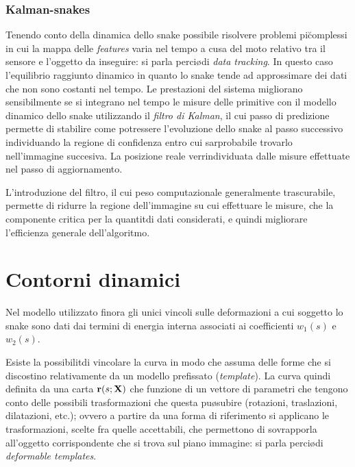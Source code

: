 \subsubsection{Kalman-snakes}

Tenendo conto della dinamica dello snake \e possibile risolvere problemi pi\u complessi
in cui la mappa delle {\it features} varia nel tempo a cusa del moto relativo tra il sensore
e l'oggetto da inseguire: si parla perci\o di {\it data tracking}.
In questo caso l'equilibrio raggiunto \e dinamico in quanto lo snake tende ad approssimare
dei dati che non sono costanti nel tempo.
Le prestazioni del sistema migliorano sensibilmente se si integrano nel tempo le misure
delle primitive con il modello dinamico dello snake utilizzando il {\it filtro di Kalman},
il cui passo di predizione permette di stabilire come potr\a essere l'evoluzione dello
snake al passo successivo individuando la regione di confidenza entro cui sar\a probabile
trovarlo nell'immagine succesiva.
La posizione reale verr\a individuata dalle misure effettuate nel passo di aggiornamento.

L'introduzione del filtro, il cui peso computazionale \e generalmente trascurabile,
permette di ridurre la regione dell'immagine su cui effettuare le misure, che \e la
componente critica per la quantit\a di dati considerati, e quindi migliorare l'efficienza
generale dell'algoritmo.

\section{Contorni dinamici}

Nel modello utilizzato finora gli unici vincoli sulle deformazioni a cui \e soggetto lo snake
sono dati dai termini di energia interna associati ai coefficienti $w_1(s)$ e $w_2(s)$.

Esiste la possibilit\a di vincolare la curva in modo che assuma delle forme che si discostino
relativamente da un modello prefissato ({\it template}).
La curva \e quindi definita da una carta ${\bf r}(s;{\bf X})$ \cite{BlakeAC}
che \e funzione di un vettore di parametri che tengono
conto delle possibili trasformazioni che questa pu\o subire (rotazioni, traslazioni,
dilatazioni, etc.); ovvero a partire da una forma di
riferimento si applicano le trasformazioni, scelte fra quelle accettabili, che permettono 
di sovrapporla all'oggetto corrispondente che si trova sul piano immagine:
si parla perci\o di {\it deformable templates}.

